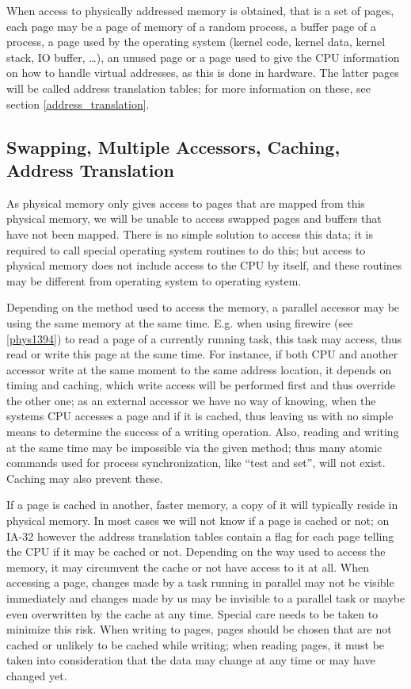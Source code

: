 When access to physically addressed memory is obtained, that is a set of pages,
each page may be a page of memory of a random process, a buffer page of a
process, a page used by the operating system (kernel code, kernel data, kernel
stack, IO buffer, \dots), an unused page or a page used to give the CPU
information on how to handle virtual addresses, as this is done in hardware.
The latter pages will be called address translation tables; for more information
on these, see section \ref{address_translation}.

\subsection{Swapping, Multiple Accessors, Caching, Address Translation}


As physical memory only gives access to pages that are mapped from this
physical memory, we will be unable to access swapped pages and buffers that
have not been mapped. There is no simple solution to access this data; it is
required to call special operating system routines to do this; but access to
physical memory does not include access to the CPU by itself, and these routines
may be different from operating system to operating system.

Depending on the method used to access the memory, a parallel accessor may be
using the same memory at the same time. E.g. when using firewire (see
\ref{phys1394}) to read a page of a currently running task, this task may
access, thus read or write this page at the same time. For instance, if both CPU
and another accessor write at the same moment to the same address location, it
depends on timing and caching, which write access will be performed first and
thus override the other one; as an external accessor we have no way of knowing,
when the systems CPU accesses a page and if it is cached, thus leaving us with
no simple means to determine the success of a writing operation.  Also, reading
and writing at the same time may be impossible via the given method; thus many
atomic commands used for process synchronization, like ``test and set'', will
not exist.  Caching may also prevent these.

If a page is cached in another, faster memory, a copy of it will typically
reside in physical memory. In most cases we will not know if a page is cached or
not; on IA-32 however the address translation tables contain a flag for each
page telling the CPU if it may be cached or not. Depending on the way used to
access the memory, it may circumvent the cache or not have access to it at all.
When accessing a page, changes made by a task running in parallel may not be
visible immediately and changes made by us may be invisible to a parallel task
or maybe even overwritten by the cache at any time. Special care needs to be
taken to minimize this risk. When writing to pages, pages should be chosen that
are not cached or unlikely to be cached while writing; when reading pages, it
must be taken into consideration that the data may change at any time or may
have changed yet.

